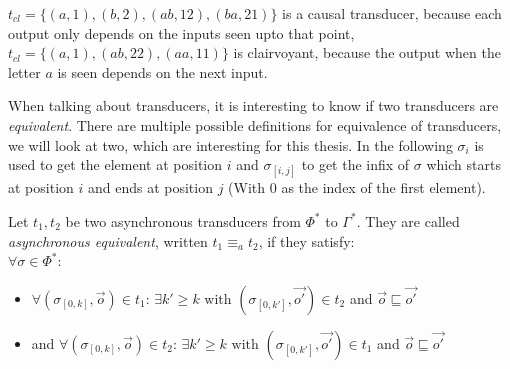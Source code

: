 \begin{exmp}[name = Causal and Clairvoyant Transducers]
  \(t_{cl} = \{(a,1),(b,2),(ab,12),(ba,21)\}\) is a causal transducer, because each output only depends on the inputs seen upto that point, \(t_{cl} = \{(a,1),(ab,22),(aa,11)\}\) is clairvoyant, because the output when the letter \(a\) is seen depends on the next input.
\end{exmp}

When talking about transducers, it is interesting to know if two transducers are \emph{equivalent}.
There are multiple possible definitions for equivalence of transducers, we will look at two, which are interesting for this thesis.
In the following \(\sigma_i\) is used to get the element at position \(i\) and \(\sigma_{[i,j]}\) to get the infix of \(\sigma\) which starts at position \(i\) and ends at position \(j\) (With \(0\) as the index of the first element).

\begin{definition}[name = Asynchronous equivalence of Transducers]\label{def:async_equivalence_transducer}
  Let \(t_1, t_2\) be two asynchronous transducers from \(\Phi^*\) to \(\Gamma^*\).
  They are called \emph{asynchronous equivalent}, written \(t_1 \equiv_a t_2\), if they satisfy: \\
  \(\forall \sigma \in \Phi^*\):
  \begin{itemize}
    \item \(\forall (\sigma_{[0,k]}, \vec{o}) \in t_1\): \(\exists k' \geq k \text{ with } (\sigma_{[0,k']}, \vec{o'}) \in t_2\) and \(\vec{o} \sqsubseteq \vec{o'}\)
    \item and \(\forall (\sigma_{[0,k]}, \vec{o}) \in t_2\): \(\exists k' \geq k \text{ with } (\sigma_{[0,k']}, \vec{o'}) \in t_1\) and \(\vec{o} \sqsubseteq \vec{o'}\)
  \end{itemize}
\end{definition}

